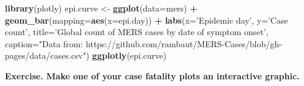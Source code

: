 \documentclass[]{article}
\newenvironment{Shaded}{\begin{snugshade}}{\end{snugshade}}
\newcommand{\KeywordTok}[1]{\textcolor[rgb]{0.13,0.29,0.53}{\textbf{#1}}}
\newcommand{\DataTypeTok}[1]{\textcolor[rgb]{0.13,0.29,0.53}{#1}}
\newcommand{\StringTok}[1]{\textcolor[rgb]{0.31,0.60,0.02}{#1}}
\newcommand{\OperatorTok}[1]{\textcolor[rgb]{0.81,0.36,0.00}{\textbf{#1}}}
\newcommand{\NormalTok}[1]{#1}
\begin{document}
\begin{Shaded}
\begin{Highlighting}[]
\KeywordTok{library}\NormalTok{(plotly)}
\NormalTok{epi.curve <-}\StringTok{ }\KeywordTok{ggplot}\NormalTok{(}\DataTypeTok{data=}\NormalTok{mers) }\OperatorTok{+}\StringTok{ }
\StringTok{  }\KeywordTok{geom_bar}\NormalTok{(}\DataTypeTok{mapping=}\KeywordTok{aes}\NormalTok{(}\DataTypeTok{x=}\NormalTok{epi.day)) }\OperatorTok{+}
\StringTok{  }\KeywordTok{labs}\NormalTok{(}\DataTypeTok{x=}\StringTok{'Epidemic day'}\NormalTok{, }\DataTypeTok{y=}\StringTok{'Case count'}\NormalTok{, }\DataTypeTok{title=}\StringTok{'Global count of MERS cases by date of symptom onset'}\NormalTok{,}
       \DataTypeTok{caption=}\StringTok{"Data from: https://github.com/rambaut/MERS-Cases/blob/gh-pages/data/cases.csv"}\NormalTok{)}
\KeywordTok{ggplotly}\NormalTok{(epi.curve)}
\end{Highlighting}
\end{Shaded}

\textbf{Exercise. Make one of your case fatality plots an interactive
graphic.}
\end{document}
